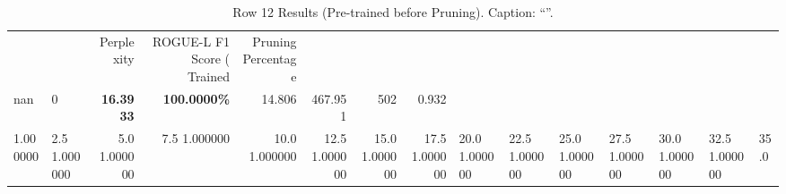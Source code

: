 \begin{table}
\caption{Row 12 Results (Pre-trained before Pruning). \ifshowcaption{}Caption: ``''.\fi}
\label{tab:evaluation-pipeline-12-trained}
\begin{tabular}{llrrrrrr}
 &  & Perplexity & ROGUE-L F1 Score (%
Trained & Pruning Percentage &  &  &  &  &  &  \\
nan & 0 & \bfseries 16.3933 & \bfseries 100.0000\% & 14.806 & 467.951 & 502 & 0.932 \\
1.000000 & 2.5%
1.000000 & 5.0%
1.000000 & 7.5%
1.000000 & 10.0%
1.000000 & 12.5%
1.000000 & 15.0%
1.000000 & 17.5%
1.000000 & 20.0%
1.000000 & 22.5%
1.000000 & 25.0%
1.000000 & 27.5%
1.000000 & 30.0%
1.000000 & 32.5%
1.000000 & 35.0%

\end{tabular}
\end{table}
